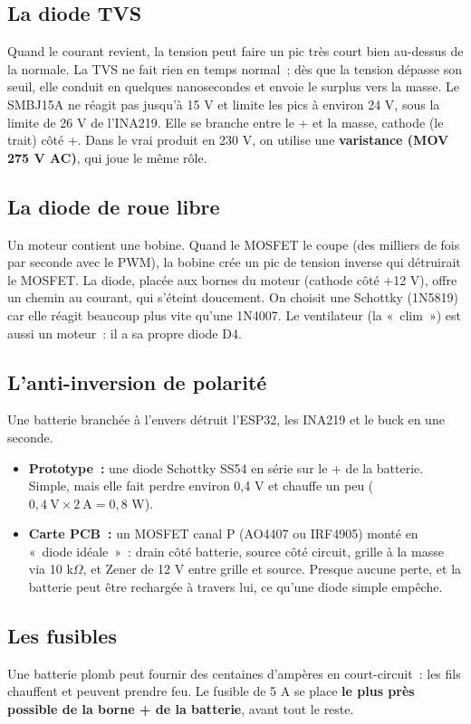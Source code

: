 \documentclass[10pt,a4paper]{article}
\begin{document}
\subsection{La diode TVS}
Quand le courant revient, la tension peut faire un pic très court bien au-dessus de la normale. La TVS ne fait rien en temps normal~; dès que la tension dépasse son seuil, elle conduit en quelques nanosecondes et envoie le surplus vers la masse. Le SMBJ15A ne réagit pas jusqu'à 15 V et limite les pics à environ 24 V, sous la limite de 26 V de l'INA219. Elle se branche entre le + et la masse, cathode (le trait) côté +. Dans le vrai produit en 230 V, on utilise une \textbf{varistance (MOV 275 V AC)}, qui joue le même rôle.

\subsection{La diode de roue libre}
Un moteur contient une bobine. Quand le MOSFET le coupe (des milliers de fois par seconde avec le PWM), la bobine crée un pic de tension inverse qui détruirait le MOSFET. La diode, placée aux bornes du moteur (cathode côté +12 V), offre un chemin au courant, qui s'éteint doucement. On choisit une Schottky (1N5819) car elle réagit beaucoup plus vite qu'une 1N4007. Le ventilateur (la «~clim~») est aussi un moteur~: il a sa propre diode D4.

\subsection{L'anti-inversion de polarité}
Une batterie branchée à l'envers détruit l'ESP32, les INA219 et le buck en une seconde.
\begin{itemize}
  \item \textbf{Prototype~:} une diode Schottky SS54 en série sur le + de la batterie. Simple, mais elle fait perdre environ 0,4 V et chauffe un peu ($0{,}4\ \text{V} \times 2\ \text{A} = 0{,}8$ W).
  \item \textbf{Carte PCB~:} un MOSFET canal P (AO4407 ou IRF4905) monté en «~diode idéale~»~: drain côté batterie, source côté circuit, grille à la masse via 10 k$\Omega$, et Zener de 12 V entre grille et source. Presque aucune perte, et la batterie peut être rechargée à travers lui, ce qu'une diode simple empêche.
\end{itemize}

\subsection{Les fusibles}
Une batterie plomb peut fournir des centaines d'ampères en court-circuit~: les fils chauffent et peuvent prendre feu. Le fusible de 5 A se place \textbf{le plus près possible de la borne + de la batterie}, avant tout le reste.
\end{document}
